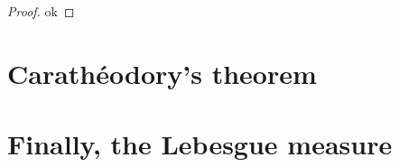 \begin{proof}
ok
\end{proof}


\section{Carathéodory's theorem} %
\label{sec:carathéodory_s_theorem}


\section{Finally, the Lebesgue measure} %
\label{sec:finally_the_lebesgue_measure}


